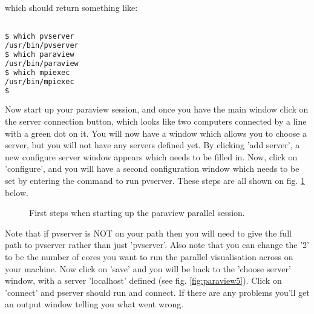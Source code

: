 which should return something like:

\begin{example}
  \begin{lstlisting}[language=bash]

$ which pvserver
/usr/bin/pvserver
$ which paraview
/usr/bin/paraview
$ which mpiexec
/usr/bin/mpiexec
$

\end{lstlisting}
\end{example}

Now start up your paraview session, and once you have the main window click on the server connection button, which looks like two computers connected by a line with a green dot on it. You will now have a window which allows you to choose a server, but you will not have any servers defined yet. By clicking 'add server', a new configure server window appears which needs to be filled in. Now, click on 'configure', and you will have a second configuration window which needs to be set by entering the command to run pvserver. These steps are all shown on fig. \ref{fig:paraview1} below.

\begin{figure}[h!]
 \centering
 \label{fig:paraview1}
\caption{First steps when starting up the paraview parallel session.}
\end{figure}


Note that if pvserver is NOT on your path then you will need to give the full path to pvserver rather than just 'pvserver'. Also note that you can change the '2' to be the number of cores you want to run the parallel visualisation across on your machine. Now click on 'save' and you will be back to the 'choose server' window, with a server 'localhost' defined (see fig. \ref{fig:paraview5}). Click on 'connect' and pserver should run and connect. If there are any problems you'll get an output window telling you what went wrong.

